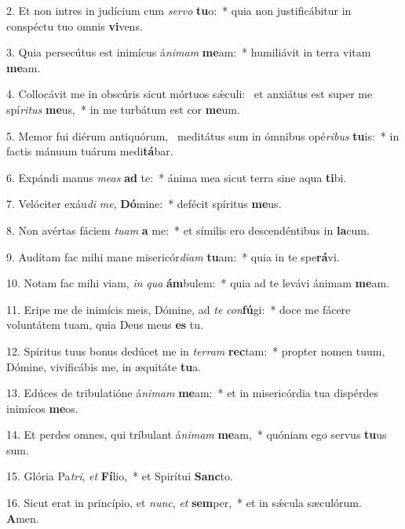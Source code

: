 2. Et non intres in judícium cum \textit{ser}\textit{vo} \textbf{tu}o:~*  quia non justificábitur in conspéctu tuo omnis \textbf{vi}vens.\

3. Quia persecútus est inimícus á\textit{ni}\textit{mam} \textbf{me}am:~*  humiliávit in terra vitam \textbf{me}am.\

4. Collocávit me in obscúris sicut mórtuos sǽculi: \dag\  et anxiátus est super me spí\textit{ri}\textit{tus} \textbf{me}us,~*  in me turbátum est cor \textbf{me}um.\

5. Memor fui diérum antiquórum, \dag\  meditátus sum in ómnibus opé\textit{ri}\textit{bus} \textbf{tu}is:~*  in factis mánuum tuárum medi\textbf{tá}bar.\

6. Expándi manus \textit{me}\textit{as} \textbf{ad} te:~*  ánima mea sicut terra sine aqua \textbf{ti}bi.\

7. Velóciter exáu\textit{di} \textit{me}, \textbf{Dó}mine:~*  defécit spíritus \textbf{me}us.\

8. Non avértas fáciem \textit{tu}\textit{am} \textbf{a} me:~*  et símilis ero descendéntibus in \textbf{la}cum.\

9. Audítam fac mihi mane misericór\textit{di}\textit{am} \textbf{tu}am:~*  quia in te spe\textbf{rá}vi.\

10. Notam fac mihi viam, \textit{in} \textit{qua} \textbf{ám}bulem:~*  quia ad te levávi ánimam \textbf{me}am.\

11. Eripe me de inimícis meis, Dómine, ad \textit{te} \textit{con}\textbf{fú}gi:~*  doce me fácere voluntátem tuam, quia Deus meus \textbf{es} tu.\

12. Spíritus tuus bonus dedúcet me in \textit{ter}\textit{ram} \textbf{rec}tam:~*  propter nomen tuum, Dómine, vivificábis me, in æquitáte \textbf{tu}a.\

13. Edúces de tribulatióne á\textit{ni}\textit{mam} \textbf{me}am:~*  et in misericórdia tua dispérdes inimícos \textbf{me}os.\

14. Et perdes omnes, qui tríbulant á\textit{ni}\textit{mam} \textbf{me}am,~*  quóniam ego servus \textbf{tu}us sum.\

15. Glória Pa\textit{tri}, \textit{et} \textbf{Fí}lio,~*  et Spirítui \textbf{Sanc}to.\

16. Sicut erat in princípio, et \textit{nunc}, \textit{et} \textbf{sem}per,~*  et in sǽcula sæculórum. \textbf{A}men.\

